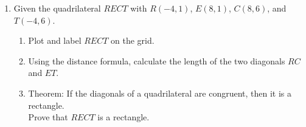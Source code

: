 \documentclass[12pt, oneside]{article}
\begin{document}
\begin{enumerate}
\newpage
\item Given the quadrilateral $RECT$ with $R(-4,1)$, $E(8,1)$, $C(8,6)$, and $T(-4,6)$.
\begin{enumerate}
  \item Plot and label $RECT$ on the grid.
  \item Using the distance formula, calculate the length of the two diagonals $RC$ and $ET$.
  \item Theorem: If the diagonals of a quadrilateral are congruent, then it is a rectangle.\\[0.5cm]
  Prove that $RECT$ is a rectangle.
\end{enumerate}

\begin{center} %
\end{center}


\end{enumerate}
\end{document}

